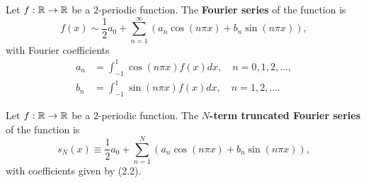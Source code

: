 \begin{definition}
    Let $f : \mathbb{R} \to \mathbb{R}$ be a $2$-periodic function. The \textbf{Fourier series} of the function is
    \begin{equation*}
        f(x) \sim \frac{1}{2} a_0 + \sum_{n=1}^{\infty} \left(a_n \cos(n\pi x) + b_n \sin(n\pi x)\right), \tag{2.1}
    \end{equation*}
    with Fourier coefficients
    \begin{equation*}
        \begin{aligned}
            a_n &= \int_{-1}^{1} \cos(n\pi x) f(x) dx, \quad n = 0, 1, 2, \dots, \\
            b_n &= \int_{-1}^{1} \sin(n\pi x) f(x) dx, \quad n = 1, 2, \dots.
        \end{aligned} \tag{2.2}
    \end{equation*}
\end{definition}

\begin{definition}
    Let $f : \mathbb{R} \to \mathbb{R}$ be a $2$-periodic function. The \textbf{$N$-term truncated Fourier series} of the function is
    \[s_N(x) \equiv \frac{1}{2} a_0 + \sum_{n=1}^{N} \left(a_n \cos(n\pi x) + b_n \sin(n\pi x)\right),\]
    with coefficients given by (2.2).
\end{definition}

